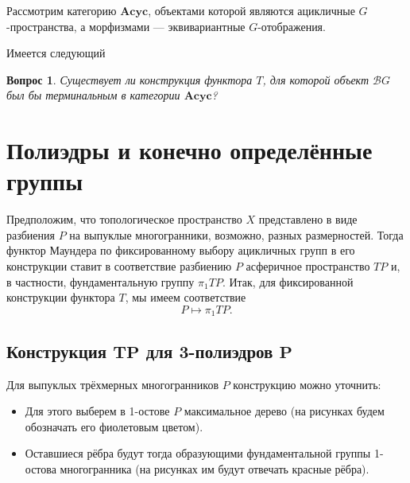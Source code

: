 \documentclass[14pt, dvipsnames, twoside]{extarticle}
\newtheorem{question}{Вопрос}
\theoremstyle{definition}
\theoremstyle{remark}
\let\saveboldsymbol\boldsymbol
\let\boldsymbol\saveboldsymbol
\begin{document}
Рассмотрим категорию $\mathbf{Acyc}$, объектами которой являются ацикличные $G$-пространства, а морфизмами --- эквивариантные $G$-отображения.

Имеется следующий 

\begin{question}
Существует ли конструкция функтора $T$, для которой объект $\mathcal{B}G$ был бы терминальным в категории $\mathbf{Acyc}$?
\end{question}
















\section{Полиэдры и конечно определённые группы}

Предположим, что топологическое пространство $X$ представлено в виде разбиения $P$ на выпуклые многогранники, возможно, разных размерностей. Тогда функтор Маундера по фиксированному выбору ацикличных групп в его конструкции ставит в соответствие разбиению $P$ асферичное пространство $TP$ и, в частности, фундаментальную группу $\pi_1 TP$. Итак, для фиксированной конструкции функтора $T$, мы имеем соответствие $$P\mapsto \pi_1TP.$$ 















\subsection{Конструкция $\boldsymbol{TP}$ для 3-полиэдров $\boldsymbol{P}$}

Для выпуклых трёхмерных многогранников $P$ конструкцию можно уточнить:

\begin{itemize}

\item Для этого выберем в 1-остове $P$ максимальное дерево (на рисунках будем обозначать его фиолетовым цветом). 

\item Оставшиеся рёбра будут тогда образующими фундаментальной группы 1-остова многогранника (на рисунках им будут отвечать красные рёбра).

\end{itemize}
\end{document}
